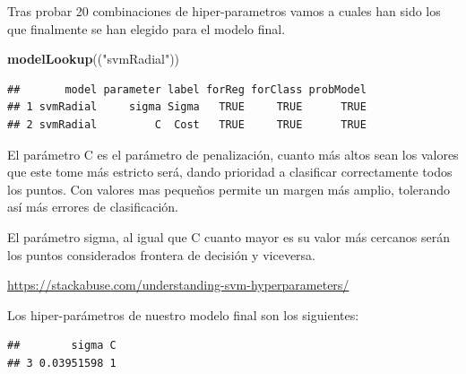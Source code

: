 \documentclass[
]{article}
\newenvironment{Shaded}{\begin{snugshade}}{\end{snugshade}}
\newcommand{\FunctionTok}[1]{\textcolor[rgb]{0.13,0.29,0.53}{\textbf{#1}}}
\newcommand{\NormalTok}[1]{#1}
\newcommand{\SpecialCharTok}[1]{\textcolor[rgb]{0.81,0.36,0.00}{\textbf{#1}}}
\newcommand{\StringTok}[1]{\textcolor[rgb]{0.31,0.60,0.02}{#1}}
\begin{document}
Tras probar 20 combinaciones de hiper-parametros vamos a cuales han sido
los que finalmente se han elegido para el modelo final.

\begin{Shaded}
\begin{Highlighting}[]
\FunctionTok{modelLookup}\NormalTok{((}\StringTok{"svmRadial"}\NormalTok{))}
\end{Highlighting}
\end{Shaded}

\begin{verbatim}
##       model parameter label forReg forClass probModel
## 1 svmRadial     sigma Sigma   TRUE     TRUE      TRUE
## 2 svmRadial         C  Cost   TRUE     TRUE      TRUE
\end{verbatim}

El parámetro C es el parámetro de penalización, cuanto más altos sean
los valores que este tome más estricto será, dando prioridad a
clasificar correctamente todos los puntos. Con valores mas pequeños
permite un margen más amplio, tolerando así más errores de
clasificación.

El parámetro sigma, al igual que C cuanto mayor es su valor más cercanos
serán los puntos considerados frontera de decisión y viceversa.

\url{https://stackabuse.com/understanding-svm-hyperparameters/}

Los hiper-parámetros de nuestro modelo final son los siguientes:

\begin{Shaded}
\end{Shaded}

\begin{verbatim}
##        sigma C
## 3 0.03951598 1
\end{verbatim}
\end{document}
